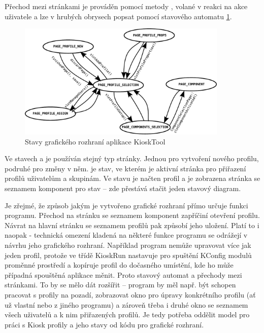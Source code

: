 Přechod mezi stránkami je prováděn pomocí metody , volané v reakci na akce uživatele a lze v hrubých obrysech popsat pomocí stavového automatu \ref{fig:kioskstates}.

\begin{figure}[h]
    \centering
    \includegraphics[width=10cm]{obrazky/stated.pdf}
    \caption{Stavy grafického rozhraní aplikace KioskTool}
    \label{fig:kioskstates}
\end{figure}

Ve stavech  a  je používán stejný typ stránky. Jednou pro vytvoření nového profilu, podruhé pro změny v něm.\linebreak {} je stav, ve kterém je aktivní stránka pro přiřazení profilů uživatelům a skupinám. Ve stavu  je načten profil a je zobrazena stránka se seznamem komponent pro stav  -- zde přestává stačit jeden stavový diagram.

Je zřejmé, že způsob jakým je vytvořeno grafické rozhraní přímo určuje funkci programu. Přechod na stránku se seznamem komponent zapříčiní otevření profilu. Návrat na hlavní stránku se seznamem profilů pak způsobí jeho uložení. Platí to i naopak - technická omezení kladená na některé funkce programu se odrážejí v návrhu jeho grafického rozhraní. Například program nemůže upravovat více jak jeden profil, protože ve třídě KioskRun nastavuje pro spuštění KConfig modulů proměnné prostředí a kopíruje profil do dočasného umístění, kde ho může případná spouštěná aplikace měnit. Proto stavový automat a přechody mezi stránkami. To by se mělo dát rozšířit -- program by měl např. být schopen pracovat s profily na pozadí, zobrazovat okno pro úpravy konkrétního profilu (ať už vlastní nebo z jiného programu) a zároveň třeba i druhé okno se seznamem všech uživatelů a k nim přiřazených profilů. Je tedy potřeba oddělit model pro práci s Kiosk profily a jeho stavy od kódu pro grafické rozhraní.

